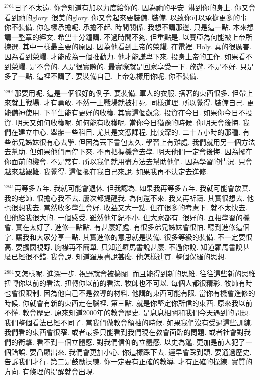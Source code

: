 \documentclass{book}
\begin{document}
$^{2761}$日子不太遠.
你會知道有加以力度給你的.
因為祂的平安.
淋到你的身上.
你又會看到祂的glory.
很美的glory.
你又會起來要裝備.
裝備.
以致你可以承擔更多的事.
你不裝備.
你怎樣承擔呢.
承擔不起.
時間關係.
我想不講那邊.
只是這一點.
本來想講一整章的經文.
希望十分鐘講.
不過時間不夠.
但重點是.
以賽亞為何能被上帝所揀選.
其中一樣最主要的原因.
因為他看到上帝的榮耀.
在電裡.
Holy.
真的很厲害.
因為看到榮耀.
才能成為一個推動力.
他才能謙卑下來.
投身上帝的工作.
如果看不到榮耀.
是不會的.
人是很實際的.
最實際就是回家享受一下.
旅遊.
不是不好.
只是多了一點.
這裡不講了.
要裝備自己.
上帝怎樣用你呢.
你不裝備.

$^{2801}$那要用呢.
這是一個很好的例子.
要裝備.
軍人的衣服.
搭著的東西很多.
但帶上來就上戰場.
才有勇敢.
不然一上戰場就被打死.
同樣道理.
所以覺得.
裝備自己.
更能備神使用.
下半生能有更好的收穫.
其實這個觀念.
投資在今日.
如果你今日不投資.
明天又如何收穫呢.
如何能有收穫呢.
當你今日猶豫的時候.
你明天會後悔.
我們在建立中心.
舉辦一些科目.
尤其是文憑課程.
比較深的.
二十五小時的那種.
有些弟兄姊妹很有心去學.
但因為丟下書包太久.
學習上有難處.
我們就用另一個方法去幫助.
但如果他們再停下來.
不再把握機會去學.
明天他們一定會後悔.
因為擺在你面前的機會.
不是常有.
所以我們就用盡方法去幫助他們.
因為學習的情況.
只會越來越艱難.
我覺得.
這個擺在我自己來說.
如果我再不決定去進修.

$^{2841}$再等多五年.
我就可能會退休.
但我認為.
如果我再等多五年.
我就可能會放棄.
我的老師.
很擔心我不去.
屢次都提醒我.
為何還不來.
我又再祈禱.
其實很想去.
他也很想我去.
當然收多學生會好.
收益又大一點.
但在很多的考慮下.
就不太快去.
但他給我很大的.
一個感受.
雖然他年紀不小.
但大家都有.
很好的.
互相學習的機會.
實在太好了.
進修一點點.
有甚麼好處.
有很多弟兄姊妹會很怕.
聽到進修這個字.
讓我和大家分享一點.
其實進修的意思就是裝備.
很多等級的裝備.
不一定要很高.
要擴闊視野.
胸襟再不簡單.
只知道羅馬書說甚麼.
不過你說.
知道羅馬書說甚麼已經很不錯.
我會說.
知道羅馬書說甚麼.
他怎樣連貫.
整個保羅的思想.

$^{2881}$又怎樣呢.
進深一步.
視野就會被擴闊.
而且能得到新的思維.
往往這些新的思維扭轉你以前的看法.
扭轉你以前的看法.
牧師也不可以.
每個人都很精彩.
牧師有時也會很限制.
因為他自己不是教導的材料.
他講的東西可能有限.
當你有機會進修的時候.
你就會有新的東西走在腦裡.
第三點.
就是你堅定你所信的東西.
原來我以前不懂.
教會歷史.
原來知道2000年的教會歷史.
是息息相關和我們今天遇到的問題.
我們整個看法已經不同了.
當我們做教會領袖的時候.
如果我們沒有受過這些訓練.
我們看的東西會很窄.
或者最多只能看到我們現在教會面臨的問題.
或者社會對我們的衝擊.
看不到一個立體感.
對我們信仰的立體感.
以史為鑑.
更加是前人犯了一個錯誤.
要凸顯出來.
我們會更加小心.
你這樣踩下去.
遲早會踩到頭.
要通過歷史.
告訴我們才行.
第二是鼓勵操練.
你一定要有正確的教導.
才有正確的操練.
實質的方向.
有條理的提醒就會出現.
\end{document}
